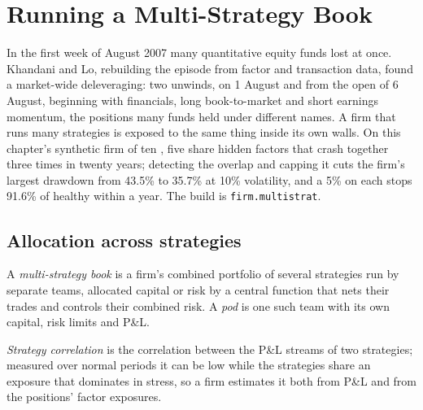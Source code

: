 \chapter{Running a Multi-Strategy Book}\label{ch:s1:running-a-multi-strategy-book}

In the first week of August 2007 many quantitative equity funds lost at once. Khandani and Lo, rebuilding the episode from factor and transaction data,
found a market-wide deleveraging: two unwinds, on 1 August and from the open of 6 August, beginning with financials, long book-to-market and short
earnings momentum, the positions many funds held under different names. A firm that runs many strategies is exposed to the same thing inside its own
walls. On this chapter's synthetic firm of ten , five share hidden factors that crash together three times in twenty years; detecting the overlap
and capping it cuts the firm's largest drawdown from 43.5\% to 35.7\% at 10\% volatility, and a 5\%  on each  stops 91.6\% of healthy
 within a year. The build is \texttt{firm.multistrat}.

\section{Allocation across strategies}

\begin{definition}\label{def:s1:running-a-multi-strategy-book:multi}
A \emph{multi-strategy book} is a firm's combined portfolio of several strategies run by separate teams, allocated capital or
risk by a central function that nets their trades and controls their combined risk. A \emph{pod} is one such team with its own capital, risk
limits and P\&L.
\end{definition}

\begin{definition}\label{def:s1:running-a-multi-strategy-book:correlation}
\emph{Strategy correlation} is the correlation between the P\&L streams of two strategies; measured over normal periods it can
be low while the strategies share an exposure that dominates in stress, so a firm estimates it both from P\&L and from the positions' factor exposures.
\end{definition}

